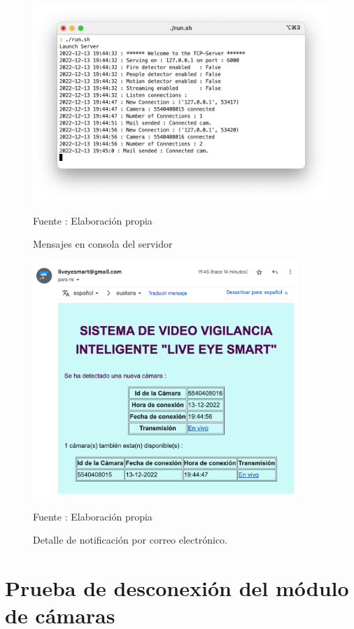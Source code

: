 \begin{figure}[H]
    \begin{center}
        \includegraphics[width=15cm]{img/capitulo_6/server_cam_connected_more_cams.png}
        \caption{Mensajes en consola del servidor}
        Fuente : Elaboración propia
    \end{center}
\end{figure}

\begin{figure}[H]
    \begin{center}
        \includegraphics[width=10cm]{img/capitulo_6/mail2.png}
        \caption{Detalle de notificación por correo electrónico.}
        Fuente : Elaboración propia
    \end{center}
\end{figure}


\section{Prueba de desconexión del módulo de cámaras}

